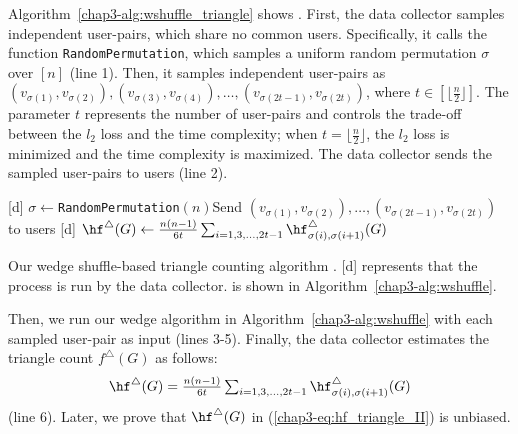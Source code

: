 Algorithm~\ref{chap3-alg:wshuffle_triangle} shows \AlgWSTri{}. 
First, the data collector samples independent user-pairs, which share no common users. 
Specifically, it calls the function \texttt{RandomPermutation}, which samples a uniform random permutation $\sigma$ over $[n]$ (line 1). 
Then, it samples independent user-pairs as 
$(v_{\sigma(1)}, v_{\sigma(2)}), (v_{\sigma(3)}, v_{\sigma(4)}), \ldots, (v_{\sigma(2t-1)}, v_{\sigma(2t)})$, where $t \in [\lfloor \frac{n}{2} \rfloor]$. 
The parameter $t$ represents the number of user-pairs and controls the trade-off between the $l_2$ loss and the time complexity; 
when $t = \lfloor \frac{n}{2} \rfloor$, the $l_2$ loss is minimized and the time complexity is maximized. 
The data collector sends the sampled user-pairs to users (line 2).

\setlength{\algomargin}{5mm}
\begin{algorithm}[t]
  \SetAlgoLined
  [d] $\sigma \leftarrow$\texttt{RandomPermutation}$(n)$\;
  [d] Send $(v_{\sigma(1)}, v_{\sigma(2)}), \ldots, (v_{\sigma(2t-1)}, v_{\sigma(2t)})$ to users\;
  [d] $\hf^\triangle(G) \leftarrow \frac{n(n-1)}{6t} \sum_{i=1, 3, \ldots, 2t-1} \hf_{\sigma(i),\sigma(i+1)}^\triangle(G)$\;
  \caption{Our wedge shuffle-based triangle counting algorithm \AlgWSTri{}.
  [d] represents that the process is run by the data collector. 
  \AlgWS{} is shown in Algorithm~\ref{chap3-alg:wshuffle}. 
  }\label{chap3-alg:wshuffle_triangle}
\end{algorithm}

Then, we run our wedge algorithm \AlgWS{} in Algorithm~\ref{chap3-alg:wshuffle} with each sampled user-pair as input (lines 3-5). 
Finally, the data collector estimates the triangle count $f^\triangle(G)$ as follows: 
\begin{align}
    \hf^\triangle(G) = \textstyle{\frac{n(n-1)}{6t} \sum_{i=1, 3, \ldots, 2t-1} \hf_{\sigma(i),\sigma(i+1)}^\triangle(G)} 
   \label{chap3-eq:hf_triangle_II}
\end{align}
(line 6). Later, we prove that $\hf^\triangle(G)$ in (\ref{chap3-eq:hf_triangle_II}) is unbiased. 

